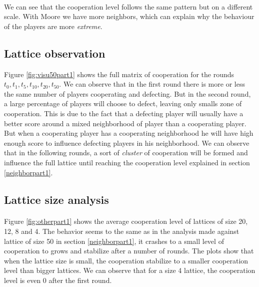 \documentclass[letterpaper]{article}
\begin{document}
\paragraph{}

We can see that the cooperation level follows the same pattern but on a
different scale. With Moore we have more neighbors, which can explain
why the behaviour of the players are more \textit{extreme}.

\subsection{Lattice observation}

Figure \ref{fig:visu50part1} shows the full matrix of cooperation for
the rounds $t_{0}, t_{1}, t_{5}, t_{10}, t_{20}, t_{50}$. We can observe
that in the first round there is more or less the same number of players
cooperating and defecting. But in the second round, a large percentage
of players will choose to defect, leaving only smalls zone of cooperation.
This is due to the fact that a defecting player will usually have a better
score around a mixed neighborhood of player than a cooperating player.
But when a cooperating player has a cooperating neighborhood he will have
high enough score to influence defecting players in his neighborhood. We can
observe that in the following rounds, a sort of \textit{cluster} of cooperation
will be formed and influence the full lattice until reaching the cooperation
level explained in section \ref{neighborpart1}.



\subsection{Lattice size analysis}

\paragraph{}

Figure \ref{fig:otherpart1}  shows the average cooperation level
of lattices of size 20, 12, 8 and 4. The behavior seems to the same
as in the analysis made against lattice of size 50
in section \ref{neighborpart1}, it crashes to a small level of cooperation
to grows and stabilize after a number of rounds. The plots show that when
the lattice size is small, the cooperation stabilize to a smaller cooperation
level than bigger lattices. We can observe that for a size 4 lattice,
the cooperation level is even 0 after the first round.
\end{document}
